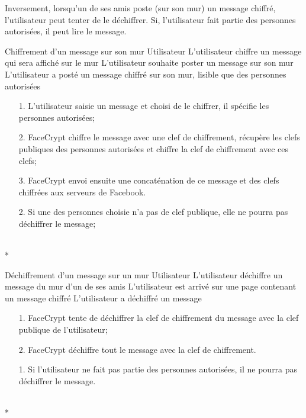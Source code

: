 \documentclass[a4paper,11pt,french]{article}
\begin{document}
Inversement, lorsqu'un de ses amis poste (sur son mur) un message chiffré,
l'utilisateur peut tenter de le déchiffrer. Si, l'utilisateur
fait partie des personnes autorisées, il peut lire le message.

\fiche
	{Chiffrement d'un message sur son mur}
	{Utilisateur}
	{L'utilisateur chiffre un message qui sera affiché sur le mur}
	{}
	{L'utilisateur souhaite poster un message sur son mur}
	{L'utilisateur a posté un message chiffré sur son mur, lisible que des personnes autorisées}
	{\begin{itemize}
	    \item[]
	  \item[1.] L'utilisateur saisie un message et choisi de le chiffrer,
          il spécifie les personnes autorisées;
	\end{itemize}
	}
	{\begin{itemize}
        \item[]
		\item[2.] FaceCrypt chiffre le message avec une clef 
        de chiffrement, récupère les clefs publiques
        des personnes autorisées et chiffre la clef de chiffrement
        avec ces clefs;
		\item[3.] FaceCrypt envoi ensuite une concaténation de 
        ce message et des clefs chiffrées aux serveurs de Facebook.
	\end{itemize}
    }
	{}
\flots
    {}
    {\begin{itemize}
    \item[]
    \item[2.] Si une des personnes choisie n'a pas de clef publique,
        elle ne pourra pas déchiffrer le message;
    \end{itemize}
    }
    {}
\\*

\fiche
	{Déchiffrement d'un message sur un mur}
	{Utilisateur}
	{L'utilisateur déchiffre un message du mur d'un de ses amis}
	{}
	{L'utilisateur est arrivé sur une page contenant un message chiffré}
	{L'utilisateur a déchiffré un message}
    {}
	{\begin{itemize}
        \item[]
		\item[1.] FaceCrypt tente de déchiffrer la clef de chiffrement
            du message avec la clef publique de l'utilisateur;
		\item[2.] FaceCrypt déchiffre tout le message avec la clef
            de chiffrement.
	\end{itemize}
	}
	{}
\flots
    {}
    {\begin{itemize}
    \item[]
    \item[1.] Si l'utilisateur ne fait pas partie des personnes
        autorisées, il ne pourra pas déchiffrer le message.
    \end{itemize}
    }
	{}    
\\*
\end{document}
